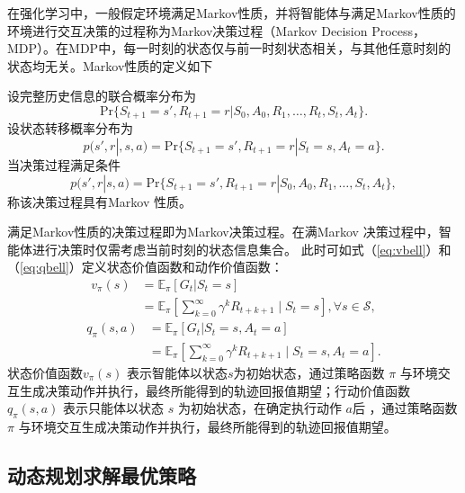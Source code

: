在强化学习中，一般假定环境满足Markov性质，并将智能体与满足Markov性质的环境进行交互决策的过程称为Markov决策过程（Markov Decision Process，MDP）\cite{white1963dynamic,ross1996stochastic}。在MDP中，每一时刻的状态仅与前一时刻状态相关，与其他任意时刻的状态均无关。Markov性质的定义如下
\begin{definition}
设完整历史信息的联合概率分布为
\begin{equation}
    \mathrm{Pr}\{S_{t+1}=s',R_{t+1}=r|S_0,A_0,R_1,\ldots,R_t,S_t,A_t\}.
\end{equation}
设状态转移概率分布为
\begin{equation}
    p(s',r|,s,a) = \mathrm{Pr}\{S_{t+1}=s',R_{t+1}=r|S_t=s,A_t=a\}.
\end{equation}
当决策过程满足条件
\begin{equation}
  p(s',r|s,a) = \mathrm{Pr}\{S_{t+1}=s',R_{t+1}=r|S_0,A_0,R_1,\ldots,S_t,A_t\},
\end{equation}
称该决策过程具有Markov 性质。
\end{definition}

满足Markov性质的决策过程即为Markov决策过程\cite{sutton2018reinforcement,white1963dynamic}。在满Markov 决策过程中，智能体进行决策时仅需考虑当前时刻的状态信息集合。
此时可如式（\ref{eq:vbell}）和（\ref{eq:qbell}）定义状态价值函数和动作价值函数：
\begin{equation}\label{eq:vbell}
\begin{aligned}
    v_{\pi}(s)&=\mathbb{E}_{\pi}\left[G_t|S_t=s\right]\\
    &=\mathbb{E}_{\pi}\left[\sum_{k=0}^{\infty}\gamma^kR_{t+k+1}\mid S_t=s\right], \forall s \in \mathcal{S},
\end{aligned}
\end{equation}
\begin{equation}\label{eq:qbell}
\begin{aligned}
    q_{\pi}(s,a)&=\mathbb{E}_{\pi}\left[G_t|S_t=s,A_t=a\right]\\
    &=\mathbb{E}_{\pi}\left[\sum_{k=0}^{\infty}\gamma^kR_{t+k+1}\mid S_t=s,A_t=a\right].
\end{aligned}
\end{equation}
状态价值函数$v_\pi(s)$ 表示智能体以状态$s$为初始状态，通过策略函数 $\pi$ 与环境交互生成决策动作并执行，最终所能得到的轨迹回报值期望；行动价值函数 $q_\pi(s,a)$ 表示只能体以状态 $s$ 为初始状态，在确定执行动作 $a$后 ，通过策略函数 $\pi$ 与环境交互生成决策动作并执行，最终所能得到的轨迹回报值期望。

\subsection{动态规划求解最优策略}

